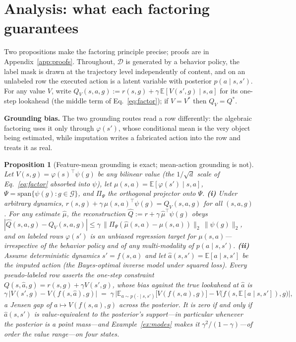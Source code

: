 \documentclass{article}
\newcommand{\E}{\mathbb{E}}
\theoremstyle{plain}
\newtheorem{proposition}{Proposition}
\theoremstyle{definition}
\begin{document}
\section{Analysis: what each factoring guarantees}
\label{sec:theory}
Two propositions make the factoring principle precise; proofs are in Appendix~\ref{app:proofs}. Throughout, $\mathcal D$ is generated by a behavior policy, the label mask is drawn at the trajectory level independently of content, and on an unlabeled row the executed action is a latent variable with posterior $p(a\mid s,s')$. For any value $V$, write $Q_V(s,a,g):=r(s,g)+\gamma\,\E[V(s',g)\mid s,a]$ for its one-step lookahead (the middle term of Eq.~\ref{eq:factor}); if $V=V^\ast$ then $Q_V=Q^\ast$.

\textbf{Grounding bias.} The two grounding routes read a row differently: the algebraic factoring uses it only through $\varphi(s')$, whose conditional mean is the very object being estimated, while imputation writes a fabricated action into the row and treats it as real.

\begin{proposition}[Feature-mean grounding is exact; mean-action grounding is not]
\label{prop:grounding}
Let $V(s,g)=\varphi(s)^{\!\top}\psi(g)$ be any bilinear value (the $1/\sqrt d$ scale of Eq.~\ref{eq:factor} absorbed into $\psi$), let $\mu(s,a)=\E[\varphi(s')\mid s,a]$, $\Psi=\mathrm{span}\{\psi(g):g\in\mathcal G\}$, and $\Pi_\Psi$ the orthogonal projector onto $\Psi$.
\textbf{(i)} Under arbitrary dynamics, $r(s,g)+\gamma\,\mu(s,a)^{\!\top}\psi(g)=Q_V(s,a,g)$ for all $(s,a,g)$. For any estimate $\hat\mu$, the reconstruction $\hat Q:=r+\gamma\,\hat\mu^{\!\top}\psi(g)$ obeys
$|\hat Q(s,a,g)-Q_V(s,a,g)|\le\gamma\,\|\Pi_\Psi(\hat\mu(s,a)-\mu(s,a))\|_2\,\|\psi(g)\|_2$,
and on labeled rows $\varphi(s')$ is an unbiased regression target for $\mu(s,a)$---irrespective of the behavior policy and of any multi-modality of $p(a\mid s,s')$.
\textbf{(ii)} Assume deterministic dynamics $s'=f(s,a)$ and let $\hat a(s,s')=\E[a\mid s,s']$ be the imputed action (the Bayes-optimal inverse model under squared loss). Every pseudo-labeled row asserts the one-step constraint $Q(s,\hat a,g)=r(s,g)+\gamma V(s',g)$, whose bias against the true lookahead at $\hat a$ is
\begin{equation}
\gamma\,\big|V(s',g)-V(f(s,\hat a),g)\big|
\;=\;\gamma\,\Big|\E_{a\sim p(\cdot\mid s,s')}\big[V(f(s,a),g)\big]-V\big(f(s,\E[a\mid s,s']),g\big)\Big|,
\label{eq:jensen}
\end{equation}
a Jensen gap of $a\mapsto V(f(s,a),g)$ across the posterior. It is zero if and only if $\hat a(s,s')$ is value-equivalent to the posterior's support---in particular whenever the posterior is a point mass---and Example~\ref{ex:modes} makes it $\gamma^2/(1-\gamma)$---of order the value range---on four states.
\end{proposition}
\end{document}
